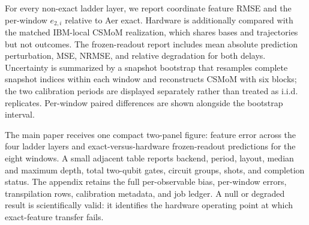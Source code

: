 For every non-exact ladder layer, we report coordinate feature RMSE and the
per-window \(e_{2,i}\) relative to Aer exact.  Hardware is additionally compared
with the matched IBM-local CSMoM realization, which shares bases and
trajectories but not outcomes.  The frozen-readout report includes mean absolute
prediction perturbation, MSE, NRMSE, and relative degradation for both delays.
Uncertainty is summarized by a snapshot bootstrap that resamples complete
snapshot indices within each window and reconstructs CSMoM with six blocks;
the two calibration periods are displayed separately rather than treated as
i.i.d. replicates.  Per-window paired differences are shown alongside the
bootstrap interval.

The main paper receives one compact two-panel figure: feature error across the
four ladder layers and exact-versus-hardware frozen-readout predictions for the
eight windows.  A small adjacent table reports backend, period, layout, median
and maximum depth, total two-qubit gates, circuit groups, shots, and completion
status.  The appendix retains the full per-observable bias, per-window errors,
transpilation rows, calibration metadata, and job ledger.  A null or degraded
result is scientifically valid: it identifies the hardware operating point at
which exact-feature transfer fails.
